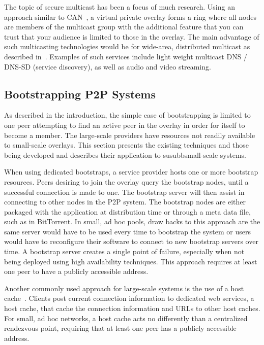 \documentclass[conference]{IEEEtran}
\begin{document}
The topic of secure multicast has been a focus of much research.  Using an
approach similar to CAN~\cite{can_multicast}, a virtual private overlay forms a
ring where all nodes are members of the multicast group with the additional
feature that you can trust that your audience is limited to those in the
overlay.  The main advantage of such multicasting technologies would be for
wide-area, distributed multicast as described in~\cite{from_peer}.  Examples of
such services include light weight multicast DNS / DNS-SD (service discovery),
as well as audio and video streaming.

\subsection{Bootstrapping P2P Systems}

As described in the introduction, the simple case of bootstrapping is limited
to one peer attempting to find an active peer in the overlay in order for
itself to become a member.  The large-scale providers have resources not
readily available to small-scale overlays.  This section presents the existing
techniques and those being developed and describes their application to
susubbsmall-scale systems.

When using dedicated bootstraps, a service provider hosts one or more bootstrap
resources.  Peers desiring to join the overlay query the bootstrap nodes, until
a successful connection is made to one.  The bootstrap server will then assist
in connecting to other nodes in the P2P system.  The bootstrap nodes are either
packaged with the application at distribution time or through a meta data file,
such as in BitTorrent.  In small, ad hoc pools, draw backs to this approach are
the same server would have to be used every time to bootstrap the system or
users would have to reconfigure their software to connect to new bootstrap
servers over time.  A bootstrap server creates a single point of failure,
especially when not being deployed using high availability techniques.  This
approach requires at least one peer to have a publicly accessible address.

Another commonly used approach for large-scale systems is the use of a host
cache~\cite{host_cache}.  Clients post current connection information to
dedicated web services, a host cache, that cache the connection information and
URLs to other host caches.  For small, ad hoc networks, a host cache acts no
differently than a centralized rendezvous point, requiring that at least one
peer has a publicly accessible address.
\end{document}
